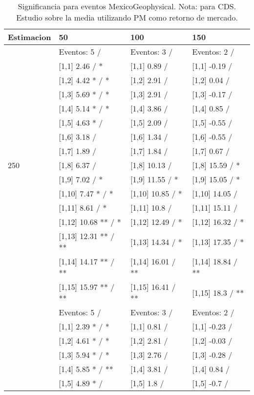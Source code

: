 \begin{table}

\caption{Significancia para eventos MexicoGeophysical. Nota: para CDS. Estudio sobre la media utilizando PM como retorno de mercado.}
\centering
\begin{tabular}[t]{llll}
\toprule
Estimacion & 50 & 100 & 150\\
\midrule
 & Eventos:  5 / & Eventos:  3 / & Eventos:  2 /\\
 & {}[1,1] 2.46  / * & {}[1,1] 0.89  / & {}[1,1] -0.19  /\\
 & {}[1,2] 4.42 * / * & {}[1,2] 2.91  / & {}[1,2] 0.04  /\\
 & {}[1,3] 5.69 * / * & {}[1,3] 2.91  / & {}[1,3] -0.17  /\\
 & {}[1,4] 5.14 * / * & {}[1,4] 3.86  / & {}[1,4] 0.85  /\\
\addlinespace
 & {}[1,5] 4.63 * / & {}[1,5] 2.09  / & {}[1,5] -0.55  /\\
 & {}[1,6] 3.18  / & {}[1,6] 1.34  / & {}[1,6] -0.55  /\\
 & {}[1,7] 1.89  / & {}[1,7] 1.84  / & {}[1,7] 0.67  /\\
250 & {}[1,8] 6.37  / & {}[1,8] 10.13  / & {}[1,8] 15.59  / *\\
 & {}[1,9] 7.02  / * & {}[1,9] 11.55  / * & {}[1,9] 15.05  / *\\
\addlinespace
 & {}[1,10] 7.47 * / * & {}[1,10] 10.85  / * & {}[1,10] 14.05  /\\
 & {}[1,11] 8.61  / * & {}[1,11] 10.8  / & {}[1,11] 15.11  /\\
 & {}[1,12] 10.68 ** / * & {}[1,12] 12.49  / * & {}[1,12] 16.32  / *\\
 & {}[1,13] 12.31 ** / ** & {}[1,13] 14.34  / * & {}[1,13] 17.35  / *\\
 & {}[1,14] 14.17 ** / ** & {}[1,14] 16.01  / ** & {}[1,14] 18.84  / **\\
\addlinespace
 & {}[1,15] 15.97 ** / ** & {}[1,15] 16.41  / ** & {}[1,15] 18.3  / **\\
 & Eventos:  5 / & Eventos:  3 / & Eventos:  2 /\\
 & {}[1,1] 2.39 * / * & {}[1,1] 0.81  / & {}[1,1] -0.23  /\\
 & {}[1,2] 4.61 * / * & {}[1,2] 2.81  / & {}[1,2] -0.03  /\\
 & {}[1,3] 5.94 * / * & {}[1,3] 2.76  / & {}[1,3] -0.28  /\\
\addlinespace
 & {}[1,4] 5.85 * / ** & {}[1,4] 3.81  / & {}[1,4] 0.84  /\\
 & {}[1,5] 4.89 * / & {}[1,5] 1.8  / & {}[1,5] -0.7  /\\

\end{tabular}
\end{table}
